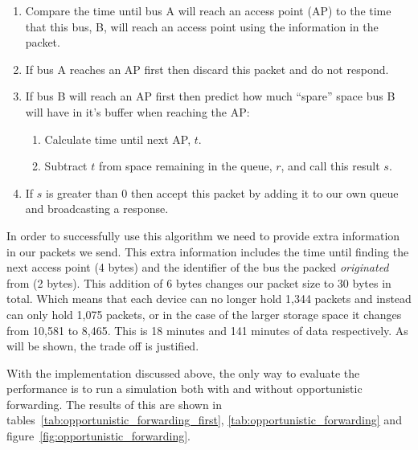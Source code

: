         \begin{enumerate}
            \item Compare the time until bus A will reach an access point (AP) to the time that this bus, B, will reach an access point using the information in the packet.
            \item If bus A reaches an AP first then discard this packet and do not respond.
            \item If bus B will reach an AP first then predict how much ``spare'' space bus B will have in it's buffer when reaching the AP:
                \begin{enumerate}
                    \item Calculate time until next AP, $t$.
                    \item Subtract $t$ from space remaining in the queue, $r$, and call this result $s$.
                \end{enumerate}
            \item If $s$ is greater than 0 then accept this packet by adding it to our own queue and broadcasting a response.
        \end{enumerate}

        In order to successfully use this algorithm we need to provide extra information in our packets we send. This extra information includes the time until finding the next access point (4 bytes) and the identifier of the bus the packed \emph{originated} from (2 bytes). This addition of 6 bytes changes our packet size to 30 bytes in total. Which means that each device can no longer hold 1,344 packets and instead can only hold 1,075 packets, or in the case of the larger storage space it changes from 10,581 to 8,465. This is 18 minutes and 141 minutes of data respectively. As will be shown, the trade off is justified. 


        With the implementation discussed above, the only way to evaluate the performance is to run a simulation both with and without opportunistic forwarding. The results of this are shown in tables~\ref{tab:opportunistic_forwarding_first}, \ref{tab:opportunistic_forwarding} and figure~\ref{fig:opportunistic_forwarding}.

